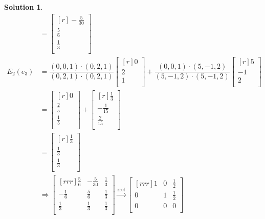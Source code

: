 \documentclass[12pt]{article}
\theoremstyle{definition}
\newtheorem*{solution}{Solution} %
\theoremstyle{plain}
\begin{document}
\begin{solution}
\begin{align*}
&= \begin{bmatrix}[r]-\frac{5}{30}\\\frac{5}{6}\\\frac{1}{3}\\\end{bmatrix}\\
E_2(e_3) &= \dfrac{(0,0,1)\cdot (0,2,1)}{(0,2,1)\cdot (0,2,1)}\begin{bmatrix}[r]0\\2\\1\\\end{bmatrix} + \dfrac{(0,0,1)\cdot (5,-1,2)}{(5,-1,2)\cdot (5,-1,2)}\begin{bmatrix}[r]5\\-1\\2\\\end{bmatrix}\\
&= \begin{bmatrix}[r]0\\\frac{2}{5}\\\frac{1}{5}\\\end{bmatrix} + \begin{bmatrix}[r]\frac{1}{3}\\-\frac{1}{15}\\\frac{2}{15}\\\end{bmatrix}\\
&= \begin{bmatrix}[r]\frac{1}{3}\\\frac{1}{3}\\\frac{1}{3}\\\end{bmatrix}\\
&\Rightarrow \begin{bmatrix}[rrr]\frac{5}{6}&-\frac{5}{30}&\frac{1}{3}\\-\frac{1}{6}&\frac{5}{6}&\frac{1}{3}\\\frac{1}{3}&\frac{1}{3}&\frac{1}{3}\\\end{bmatrix} \xrightarrow[]{\mathrm{rref}} \begin{bmatrix}[rrr]1&0&\frac{1}{2}\\0&1&\frac{1}{2}\\0&0&0\\\end{bmatrix}
\end{align*}


\end{solution}
\end{document}
